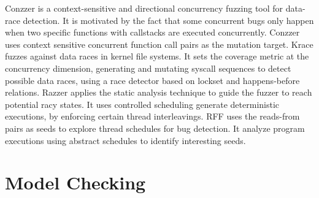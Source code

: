 Conzzer\cite{conzzer} is a context-sensitive and directional concurrency fuzzing tool for data-race detection. It is motivated by the fact that some concurrent bugs only happen when two specific functions with callstacks are executed concurrently. Conzzer uses context sensitive concurrent function call pairs as the mutation target.
Krace\cite{fuzz:Krace} fuzzes against data races in kernel file systems. It sets the coverage metric at the concurrency dimension, generating and mutating syscall sequences to detect possible data races, using a race detector based on lockset and happens-before relations.
Razzer\cite{fuzz:Razzer} applies the static analysis technique to guide the fuzzer to reach potential racy states. It uses controlled scheduling generate deterministic executions, by enforcing certain thread interleavings.
RFF\cite{rff} uses the reads-from pairs as seeds to explore thread schedules for bug detection. It analyze program executions using abstract schedules to identify interesting seeds.





\section{Model Checking}

